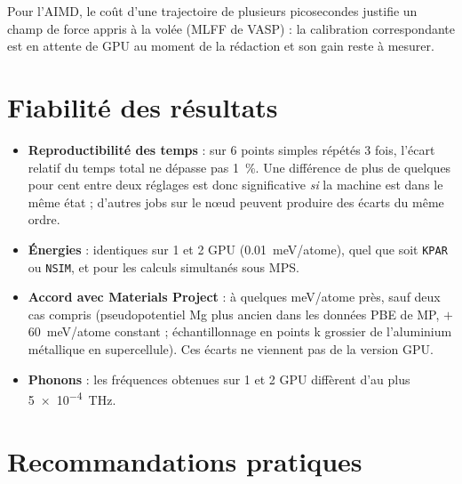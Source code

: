 \documentclass[11pt,a4paper]{article}
\begin{document}
Pour l'AIMD, le coût d'une trajectoire de plusieurs picosecondes justifie un champ de force
appris à la volée (MLFF de VASP) : la calibration correspondante est en attente de GPU au moment
de la rédaction et son gain reste à mesurer.

\section{Fiabilité des résultats}
\label{sec:fiabilite}

\begin{itemize}
  \item \textbf{Reproductibilité des temps} : sur 6 points simples répétés 3 fois, l'écart
        relatif du temps total ne dépasse pas \SI{1}{\percent}. Une différence de plus de
        quelques pour cent entre deux réglages est donc significative \emph{si} la machine
        est dans le même état ; d'autres jobs sur le nœud peuvent produire des écarts du même
        ordre.
  \item \textbf{Énergies} : identiques sur 1 et 2 GPU (\SI{0,01}{meV/atome}), quel que soit
        \texttt{KPAR} ou \texttt{NSIM}, et pour les calculs simultanés sous MPS.
  \item \textbf{Accord avec Materials Project} : à quelques meV/atome près, sauf deux cas
        compris (pseudopotentiel Mg plus ancien dans les données PBE de MP, $+$\SI{60}{meV/atome}
        constant ; échantillonnage en points k grossier de l'aluminium métallique en
        supercellule). Ces écarts ne viennent pas de la version GPU.
  \item \textbf{Phonons} : les fréquences obtenues sur 1 et 2 GPU diffèrent d'au plus
        \SI{5e-4}{THz}.
\end{itemize}

\section{Recommandations pratiques}
\label{sec:recommandations}
\end{document}
